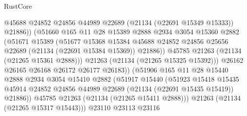 \begin{lexlean}{RustCore}
\begin{coremodule}
                                @45688
                                @24852
                                @24856
                                @44989
                                @22689
                                (@21134 (@22691 @15349 @15333))
                                @21886))
                            (@51660
                              @165
                              @11
                              @28
                              @15389
                              @2888
                              @2934
                              @3054
                              @15360
                              @2882
                              (@51671
                                @15389
                                (@51677
                                  @15368
                                  @15384
                                  @45688
                                  @24852
                                  @24856
                                  @25656
                                  @22689
                                  (@21134 (@22691 @15384 @15369))
                                  @21886))
                              @45785
                              @21263
                              (@21134 (@21265 @15361 @2888)))
                            @21263
                            (@21134 (@21265 @15325 @15392)))
                          @26162
                          @26165
                          @26168
                          @26172
                          @26177
                          @26183))
                      (@51906
                        @165
                        @11
                        @28
                        @15440
                        @2888
                        @2934
                        @3054
                        @15410
                        @2882
                        (@51917
                          @15440
                          (@51923
                            @15418
                            @15435
                            @45914
                            @24852
                            @24856
                            @44989
                            @22689
                            (@21134 (@22691 @15435 @15419))
                            @21886))
                        @45785
                        @21263
                        (@21134 (@21265 @15411 @2888)))
                      @21263
                      (@21134 (@21265 @15317 @15443)))
                    @23110
                    @23113
                    @23116

\end{coremodule}
\end{lexlean}

